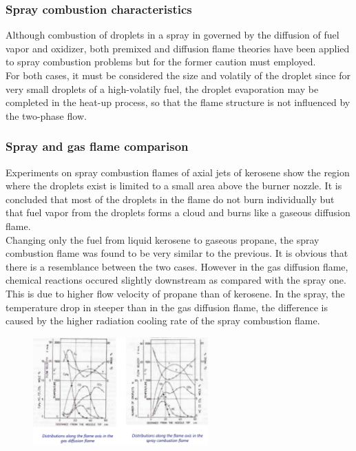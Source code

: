 \documentclass[12pt]{article}
\begin{document}
\subsubsection{Spray combustion characteristics}

Although combustion of droplets in a spray in governed by the diffusion of fuel vapor and oxidizer, both premixed and diffusion flame theories have been applied to spray combustion problems but for the former caution must employed.\\ For both cases, it must be considered the size and volatily of the droplet since for very small droplets of a high-volatily fuel, the droplet evaporation may be completed in the heat-up process, so that the flame structure is not influenced by the two-phase flow.

\subsubsection{Spray and gas flame comparison}

Experiments on spray combustion flames of axial jets of kerosene show the region where the droplets exist is limited to a small area above the burner nozzle. It is concluded that most of the droplets in the flame do not burn individually but that fuel vapor from the droplets forms a cloud and burns like a gaseous diffusion flame.\\ Changing only the fuel from liquid kerosene to gaseous propane, the spray combustion flame was found to be very similar to the previous. It is obvious that there is a resemblance between the two cases. However in the gas diffusion flame, chemical reactions occured slightly downstream as compared with the spray one. This is due to higher flow velocity of propane than of kerosene. In the spray, the temperature drop in steeper than in the gas diffusion flame, the difference is caused by the higher radiation cooling rate of the spray combustion flame.

\begin{figure}[!ht]
\centering
\includegraphics[width=0.6\textwidth]{figures/spraygas.png}
\end{figure}
\end{document}
